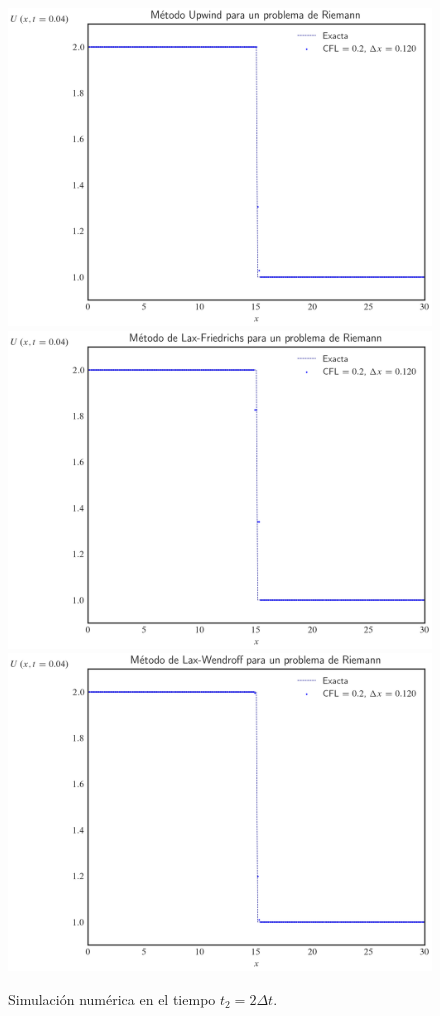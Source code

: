 \begin{figure}[ht!]
	\centering
	\includegraphics[width=.30\paperwidth]{../snapshots/upwindheaviside1d-2.png}
	\includegraphics[width=.30\paperwidth]{../snapshots/lax-friedrichsheaviside1d-2.png}
	\includegraphics[width=.30\paperwidth]{../snapshots/lax-wendroffheaviside1d-2.png}
	\caption{Simulación numérica en el tiempo $t_{2}=2\Delta t$.}
	\label{fig:example2t2}
\end{figure}

